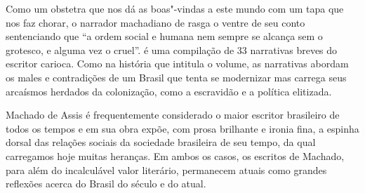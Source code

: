 \hspace*{-7cm}\hrulefill\hspace*{-7cm}

\medskip

\noindent{}Como um obstetra que nos dá as boas"-vindas a este mundo com um tapa que nos faz chorar, o narrador machadiano de {} rasga o ventre de seu conto sentenciando que “a ordem social e humana nem sempre se alcança sem o grotesco, e alguma vez o cruel”. {} é uma compilação de 33 narrativas breves do escritor carioca. Como na história que intitula o volume, as narrativas abordam os males e contradições de um Brasil que tenta se modernizar mas carrega seus arcaísmos herdados da colonização, como a escravidão e a política elitizada.

Machado de Assis é frequentemente considerado o maior escritor brasileiro de todos os tempos e em sua obra expõe, com prosa brilhante e ironia fina, a espinha dorsal das relações sociais da sociedade brasileira de seu tempo, da qual carregamos hoje muitas heranças. Em ambos os casos, os escritos de Machado, para além do incalculável valor literário, permanecem atuais como grandes reflexões acerca do Brasil do século  e do atual.


\vfill

\hspace*{-.4cm}\begin{minipage}[c]{.5\linewidth}
\small{
{}}
\end{minipage}

\pagebreak

